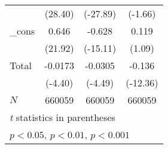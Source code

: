 \begin{table}[htbp]
\begin{tabular}{l*{3}{c}}
            &     (28.40)         &    (-27.89)         &     (-1.66)         \\
[1em]
\_cons      &       0.646\sym{***}&      -0.628\sym{***}&       0.119         \\
            &     (21.92)         &    (-15.11)         &      (1.09)         \\
[1em]
Total       &     -0.0173\sym{***}&     -0.0305\sym{***}&      -0.136\sym{***}\\
            &     (-4.40)         &     (-4.49)         &    (-12.36)         \\
\hline
\(N\)       &      660059         &      660059         &      660059         \\
\hline\hline
\multicolumn{4}{l}{\footnotesize \textit{t} statistics in parentheses}\\
\multicolumn{4}{l}{\footnotesize \sym{*} \(p<0.05\), \sym{**} \(p<0.01\), \sym{***} \(p<0.001\)}\\
\end{tabular}
\end{table}
